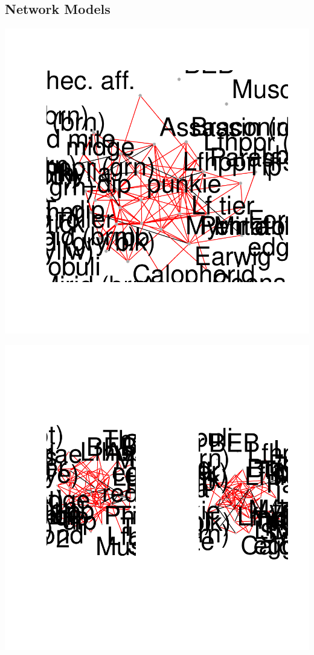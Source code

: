 \documentclass[12pt]{article}
\begin{document}
\subsection{Network Models}


\includegraphics{pb_removal-006}

\includegraphics{pb_removal-007}
\end{document}
